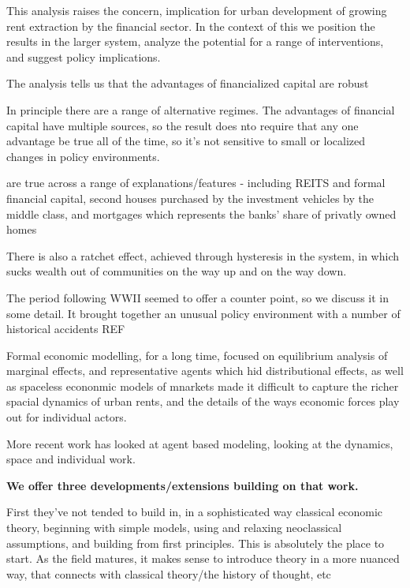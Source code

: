 This analysis raises the concern, implication for urban development of growing rent extraction by the financial sector.   In the context of this we position the results in the larger system, analyze the potential for a range of interventions, and suggest policy implications.



The analysis tells us that the advantages of financialized capital are robust 

In principle there are a range of alternative regimes.
The advantages of financial capital have multiple sources, so the result does nto require that any one advantage be true all of the time, so it's not sensitive to small or localized changes in policy environments.

are true across a range of explanations/features - including REITS and formal financial capital, second houses purchased by the investment vehicles by the middle class, and mortgages which represents the banks' share of privatly owned homes

There is also a ratchet effect, achieved through hysteresis in the system, in which sucks wealth out of communities on the way up and on the way down.

The period following WWII seemed to offer a counter point, so we discuss it in some detail. It brought together an unusual policy environment with a number of historical accidents REF




Formal economic modelling, for a long time, focused on equilibrium analysis of marginal effects, and representative agents which hid distributional effects, as well as spaceless econonmic models of mnarkets made it difficult to capture the richer spacial dynamics of urban rents, and the details of the ways economic forces play out for individual actors.

More recent work has looked at agent based modeling, looking at the dynamics, space and individual work. 

\textbf{We offer three developments/extensions building on that work.}

First they've not tended to build in, in a sophisticated way classical economic theory, beginning with simple models, using and relaxing neoclassical assumptions, and building from first principles. This is absolutely the place to start. As the field matures, it makes sense to introduce theory in a more nuanced way, that connects with classical theory/the history of thought, etc

